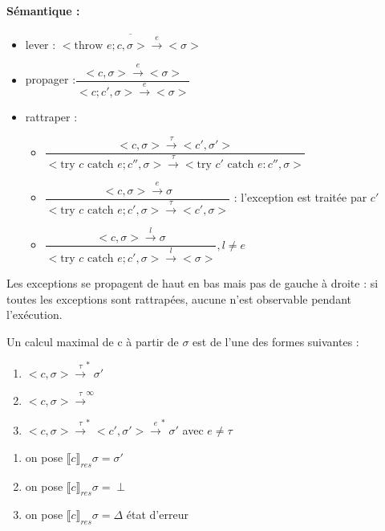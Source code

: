 \documentclass[10pt,a4paper]{article}
\newcommand{\semm}[1]{\llbracket #1 \rrbracket }
\begin{document}
\paragraph*{Sémantique : }
\begin{itemize}
\item lever : $\overline{<\text{throw }e; c,\sigma> \xrightarrow{e} <\sigma>}$\\

\item propager :$\dfrac{<c, \sigma > \xrightarrow{e} <\sigma>}{<c;c', \sigma > \xrightarrow{e} <\sigma>}$ \\

\item rattraper : \begin{itemize}
\item $\dfrac{< c, \sigma > \xrightarrow{\tau} < c', \sigma' >}{<\text{try }c\text{ catch }e;c'', \sigma > \xrightarrow{\tau} <\text{try }c'\text{ catch }e:c'', \sigma > }$\\
\item  $\dfrac{< c, \sigma > \xrightarrow{e} \sigma}{<\text{try }c\text{ catch }e;c', \sigma > \xrightarrow{\tau} <c', \sigma > }$ : l'exception est traitée par $c'$\\
\item  $\dfrac{< c, \sigma > \xrightarrow{l} \sigma}{<\text{try }c\text{ catch }e;c', \sigma > \xrightarrow{l} < \sigma > }, l \not = e$
\end{itemize}
\end{itemize}
\begin{rem} Les exceptions se propagent de  haut en bas mais pas de gauche à droite :  si toutes les exceptions sont rattrapées, aucune n'est observable pendant l'exécution.
\end{rem}

\begin{thm} Un calcul maximal de c à partir de $\sigma$ est de l'une des formes suivantes : 
\begin{enumerate}
\item $<c, \sigma> \xrightarrow{\tau}^* \sigma'$
\item $<c, \sigma> \xrightarrow{\tau}^{\infty}$
\item $<c, \sigma> \xrightarrow{\tau}^* <c',\sigma'> \xrightarrow{e}^* \sigma'$ avec $e \not = \tau$
\end{enumerate}
\begin{enumerate}
\item on pose $\semm{c}_{res} \sigma = \sigma'$
\item on pose $\semm{c}_{res} \sigma = \perp$
\item on pose $\semm{c}_{res} \sigma = \Delta$ état d'erreur
\end{enumerate}
\end{thm}
\end{document}
